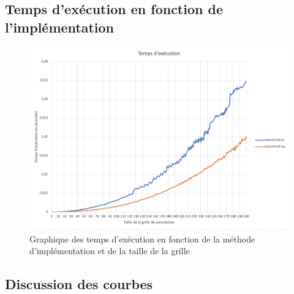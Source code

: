 \documentclass[12pt]{article}
\begin{document}
\subsection{Temps d'exécution en fonction de l'implémentation}

\begin{figure}[!h]
    \centering
    \includegraphics[scale = 0.4]{Temps.png}
    \caption{Graphique des temps d'exécution en fonction de la méthode d'implémentation et de la taille de la grille}
    \label{fig:my_label}
\end{figure}
\subsection{Discussion des courbes}
\end{document}
